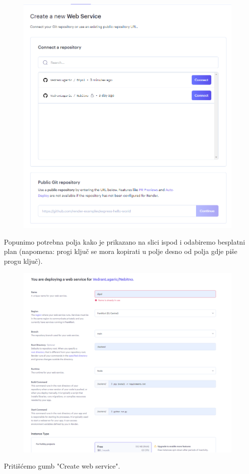 				\begin{figure}[htb]
					\centering
					\includegraphics[width=15cm]{slike/back_4.png}
					\label{fig:fer-logo}
				\end{figure}
				\newpage
				\text{}Popunimo potrebna polja kako je prikazano na slici ispod i odabiremo besplatni plan (napomena: progi ključ se mora kopirati u polje desno od polja gdje piše progu ključ).
				
				\begin{figure}[htb]
					\centering
					\includegraphics[width=15cm]{slike/back_5.png}
					\label{fig:fer-logo}
				\end{figure}
				\newpage
				\text{}Pritišćemo gumb "Create web service".
				
